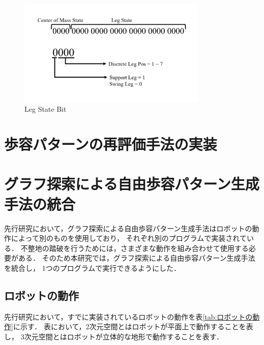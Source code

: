 \begin{figure}[htbp]
  \begin{center}
    \includegraphics[width=90mm, clip]{figure/chapter3/leg_state.png}
    \caption{Leg State Bit}
    \label{fig:leg_state_bit} %
  \end{center}
\end{figure}

\section{歩容パターンの再評価手法の実装}

\section{グラフ探索による自由歩容パターン生成手法の統合}
先行研究において，グラフ探索による自由歩容パターン生成手法はロボットの動作によって別のものを使用しており，
それぞれ別のプログラムで実装されている．
不整地の踏破を行うためには，さまざまな動作を組み合わせて使用する必要がある．
そのため本研究では，グラフ探索による自由歩容パターン生成手法を統合し，
1つのプログラムで実行できるようにした．

\subsection{ロボットの動作}
先行研究において，すでに実装されているロボットの動作を表\ref{tab:ロボットの動作}に示す．
表において，2次元空間とはロボットが平面上で動作することを表し，
3次元空間とはロボットが立体的な地形で動作することを表す．

